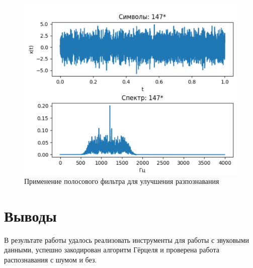 \begin{figure}[ht] 
	\center
	\includegraphics [scale=0.7] {my_folder/images/noize}
	\caption{Применение полосового фильтра для улучшения разпознавания} 
	\label{fig:noize}
	\end{figure}

\section{Выводы} \label{ch2:conclusion}

В результате работы удалось реализовать инструменты для работы с звуковыми данными, успешно закодирован алгоритм Гёрцеля и проверена работа распознавания с шумом и без.


%
\newpage %
\newpage\leavevmode\thispagestyle{empty}\newpage %